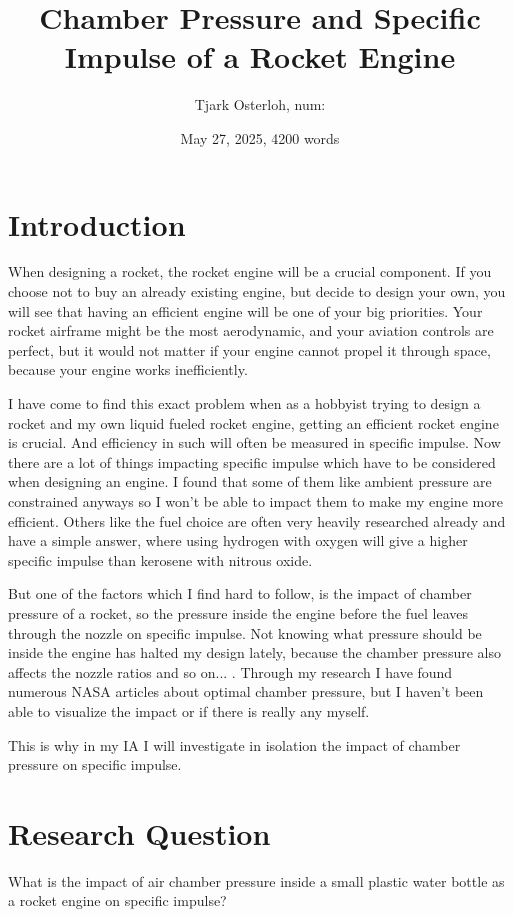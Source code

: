 \documentclass[12pt,a4paper]{article}
\title{\textbf{Chamber Pressure and Specific Impulse of a Rocket Engine}}
\author{Tjark Osterloh, num:}
\date{May 27, 2025, 4200 words}
\begin{document}
\maketitle

\section{Introduction}

When designing a rocket, the rocket engine will be a crucial component. If you choose not to buy an already existing engine, but decide to design your own, you will see that having an efficient engine will be one of your big priorities. Your rocket airframe might be the most aerodynamic, and your aviation controls are perfect, but it would not matter if your engine cannot propel it through space, because your engine works inefficiently.

I have come to find this exact problem when as a hobbyist trying to design a rocket and my own liquid fueled rocket engine, getting an efficient rocket engine is crucial. And efficiency in such will often be measured in specific impulse. Now there are a lot of things impacting specific impulse which have to be considered when designing an engine. I found that some of them like ambient pressure are constrained anyways so I won't be able to impact them to make my engine more efficient. Others like the fuel choice are often very heavily researched already and have a simple answer, where using hydrogen with oxygen will give a higher specific impulse than kerosene with nitrous oxide.

But one of the factors which I find hard to follow, is the impact of chamber pressure of a rocket, so the pressure inside the engine before the fuel leaves through the nozzle on specific impulse. Not knowing what pressure should be inside the engine has halted my design lately, because the chamber pressure also affects the nozzle ratios and so on... . Through my research I have found numerous NASA articles about optimal chamber pressure, but I haven't been able to visualize the impact or if there is really any myself.

This is why in my IA I will investigate in isolation the impact of chamber pressure on specific impulse.

\section{Research Question}

What is the impact of air chamber pressure inside a small plastic water bottle as a rocket engine on specific impulse?
\end{document}
